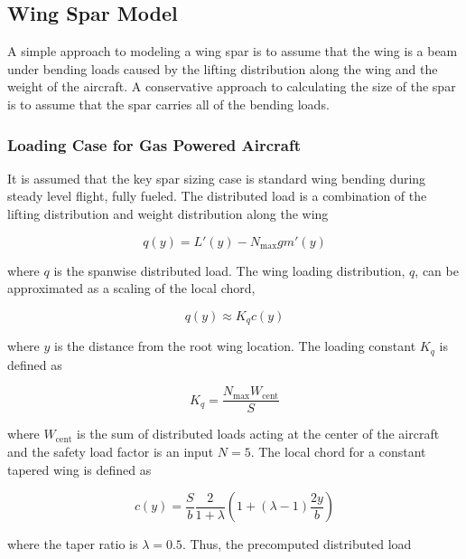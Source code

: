 \documentclass[]{aiaa-tc}%
\begin{document}
\subsection{Wing Spar Model}

    A simple approach to modeling a wing spar is to assume that the wing is a beam under bending loads caused by the lifting distribution along the wing and the weight of the aircraft. 
A conservative approach to calculating the size of the spar is to assume that the spar carries all of the bending loads.  

\subsubsection{Loading Case for Gas Powered Aircraft}

It is assumed that the key spar sizing case is standard wing bending during steady level flight, fully fueled. The distributed load is a combination of the lifting distribution and weight distribution along the wing

\begin{equation}
    \label{e:wloading}
    q(y) = L'(y) - N_{\text{max}}gm'(y)
\end{equation}

where $q$ is the spanwise distributed load. 
The wing loading distribution, $q$, can be approximated as a scaling of the local chord,\cite{bending}

\begin{equation}
    \label{e:wingloading}
    q(y) \approx K_q c(y) 
\end{equation}

where $y$ is the distance from the root wing location. The loading constant $K_q$\cite{bending} is defined as

\begin{equation}
    \label{e:kq}
    K_q = \frac{N_{\text{max}}W_{\text{cent}}}{S}
\end{equation}

where $W_{\text{cent}}$ is the sum of distributed loads acting at the center of the aircraft and the safety load factor is an input $N=5$. The local chord for a constant tapered wing\cite{bending} is defined as 

\begin{equation}
    \label{e:localchord}
    c(y) = \frac{S}{b} \frac{2}{1+\lambda} \left( 1 + (\lambda - 1) \frac{2y}{b} \right)
\end{equation}

where the taper ratio is $\lambda=0.5$.  Thus, the precomputed distributed load 
\end{document}
